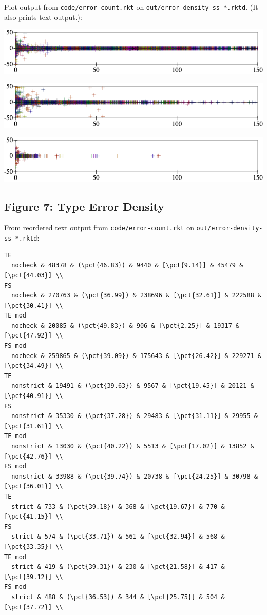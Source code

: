 \documentclass{article}
\begin{document}
Plot output from \texttt{code/error-count.rkt}
on \texttt{out/error-density-ss-*.rktd}.
(It also prints text output.):

\includegraphics[width=0.8\columnwidth]{out/error-count-nocheck-row--te-density-diff.pdf}

\includegraphics[width=0.8\columnwidth]{out/error-count-nonstrict-row--te-density-diff.pdf}

\includegraphics[width=0.8\columnwidth]{out/error-count-strict-row--te-density-diff.pdf}


\subsection*{Figure 7: Type Error Density}

From reordered text output from \texttt{code/error-count.rkt}
on \texttt{out/error-density-ss-*.rktd}:

\begin{verbatim}
TE
  nocheck & 48378 & (\pct{46.83}) & 9440 & [\pct{9.14}] & 45479 & [\pct{44.03}] \\
FS
  nocheck & 270763 & (\pct{36.99}) & 238696 & [\pct{32.61}] & 222588 & [\pct{30.41}] \\
TE mod
  nocheck & 20085 & (\pct{49.83}) & 906 & [\pct{2.25}] & 19317 & [\pct{47.92}] \\
FS mod
  nocheck & 259865 & (\pct{39.09}) & 175643 & [\pct{26.42}] & 229271 & [\pct{34.49}] \\
TE
  nonstrict & 19491 & (\pct{39.63}) & 9567 & [\pct{19.45}] & 20121 & [\pct{40.91}] \\
FS
  nonstrict & 35330 & (\pct{37.28}) & 29483 & [\pct{31.11}] & 29955 & [\pct{31.61}] \\
TE mod
  nonstrict & 13030 & (\pct{40.22}) & 5513 & [\pct{17.02}] & 13852 & [\pct{42.76}] \\
FS mod
  nonstrict & 33988 & (\pct{39.74}) & 20738 & [\pct{24.25}] & 30798 & [\pct{36.01}] \\
TE
  strict & 733 & (\pct{39.18}) & 368 & [\pct{19.67}] & 770 & [\pct{41.15}] \\
FS
  strict & 574 & (\pct{33.71}) & 561 & [\pct{32.94}] & 568 & [\pct{33.35}] \\
TE mod
  strict & 419 & (\pct{39.31}) & 230 & [\pct{21.58}] & 417 & [\pct{39.12}] \\
FS mod
  strict & 488 & (\pct{36.53}) & 344 & [\pct{25.75}] & 504 & [\pct{37.72}] \\
\end{verbatim}
\end{document}
